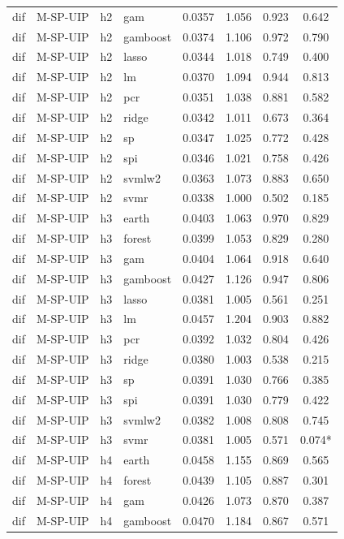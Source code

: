 \begin{ThreePartTable}
\begin{longtable}[t]{llclcccc}
dif & M-SP-UIP & h2 & gam & 0.0357 & 1.056 & 0.923 & 0.642\\
dif & M-SP-UIP & h2 & gamboost & 0.0374 & 1.106 & 0.972 & 0.790\\
dif & M-SP-UIP & h2 & lasso & 0.0344 & 1.018 & 0.749 & 0.400\\
dif & M-SP-UIP & h2 & lm & 0.0370 & 1.094 & 0.944 & 0.813\\
dif & M-SP-UIP & h2 & pcr & 0.0351 & 1.038 & 0.881 & 0.582\\
dif & M-SP-UIP & h2 & ridge & 0.0342 & 1.011 & 0.673 & 0.364\\
dif & M-SP-UIP & h2 & sp & 0.0347 & 1.025 & 0.772 & 0.428\\
dif & M-SP-UIP & h2 & spi & 0.0346 & 1.021 & 0.758 & 0.426\\
dif & M-SP-UIP & h2 & svmlw2 & 0.0363 & 1.073 & 0.883 & 0.650\\
dif & M-SP-UIP & h2 & svmr & 0.0338 & 1.000 & 0.502 & 0.185\\
\addlinespace
dif & M-SP-UIP & h3 & earth & 0.0403 & 1.063 & 0.970 & 0.829\\
dif & M-SP-UIP & h3 & forest & 0.0399 & 1.053 & 0.829 & 0.280\\
dif & M-SP-UIP & h3 & gam & 0.0404 & 1.064 & 0.918 & 0.640\\
dif & M-SP-UIP & h3 & gamboost & 0.0427 & 1.126 & 0.947 & 0.806\\
dif & M-SP-UIP & h3 & lasso & 0.0381 & 1.005 & 0.561 & 0.251\\
dif & M-SP-UIP & h3 & lm & 0.0457 & 1.204 & 0.903 & 0.882\\
dif & M-SP-UIP & h3 & pcr & 0.0392 & 1.032 & 0.804 & 0.426\\
dif & M-SP-UIP & h3 & ridge & 0.0380 & 1.003 & 0.538 & 0.215\\
dif & M-SP-UIP & h3 & sp & 0.0391 & 1.030 & 0.766 & 0.385\\
dif & M-SP-UIP & h3 & spi & 0.0391 & 1.030 & 0.779 & 0.422\\
dif & M-SP-UIP & h3 & svmlw2 & 0.0382 & 1.008 & 0.808 & 0.745\\
dif & M-SP-UIP & h3 & svmr & 0.0381 & 1.005 & 0.571 & 0.074*\\
\addlinespace
dif & M-SP-UIP & h4 & earth & 0.0458 & 1.155 & 0.869 & 0.565\\
dif & M-SP-UIP & h4 & forest & 0.0439 & 1.105 & 0.887 & 0.301\\
dif & M-SP-UIP & h4 & gam & 0.0426 & 1.073 & 0.870 & 0.387\\
dif & M-SP-UIP & h4 & gamboost & 0.0470 & 1.184 & 0.867 & 0.571\\

\end{longtable}
\end{ThreePartTable}
